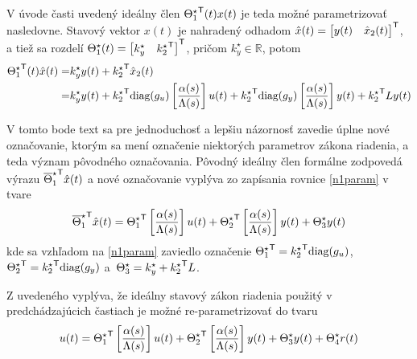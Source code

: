 \documentclass[a4paper, 10pt, ]{article}
\begin{document}
V úvode časti uvedený ideálny člen ${\Theta_1^\star}^{\mathsf{T}}(t) x(t)$ je teda možné parametrizovať nasledovne. Stavový vektor $x(t)$ je nahradený odhadom $\hat{x}(t) = \begin{bmatrix} y(t) & \hat{x}_2(t) \end{bmatrix}^{\mathsf{T}}$, a tiež sa rozdelí $\Theta_1^\star(t) = \begin{bmatrix} k_y^\star & {k_2^\star}^{\mathsf{T}} \end{bmatrix}^{\mathsf{T}}$, pričom $k_y^\star \in \mathbb{R}$, potom
\begin{equation} \label{n1param}
	\begin{split}
		{\Theta_1^\star}^{\mathsf{T}}(t) \hat{x}(t)
		= &
		k_y^\star y(t) + {k_2^\star}^{\mathsf{T}} \hat{x}_2(t)
		\\ = &
		k_y^\star y(t)
		+
		{k_2^\star}^{\mathsf{T}}
		\text{diag}(g_u) \left[ \frac{\alpha(s)}{\Lambda(s)} \right] u(t)
		+
		{k_2^\star}^{\mathsf{T}}
		\text{diag}(g_y) \left[ \frac{\alpha(s)}{\Lambda(s)} \right] y(t)
		+ {k_2^\star}^{\mathsf{T}} L y(t)
	\end{split}
\end{equation}










V tomto bode text sa pre jednoduchosť a lepšiu názornosť zavedie úplne nové označovanie, ktorým sa mení označenie niektorých parametrov zákona riadenia, a teda význam pôvodného označovania. Pôvodný ideálny člen formálne zodpovedá výrazu ${\overline{\Theta}_1^\star}^{\mathsf{T}} \hat{x}(t)$ a nové označovanie vyplýva zo zapísania rovnice \eqref{n1param} v tvare
\begin{equation} \label{n1param2}
	{\overline{\Theta}_1^\star}^{\mathsf{T}} \hat{x}(t)
	=
	{\Theta_1^\star}^{\mathsf{T}} \left[ \frac{\alpha(s)}{\Lambda(s)} \right] u(t)
	+
	{\Theta_2^\star}^{\mathsf{T}} \left[ \frac{\alpha(s)}{\Lambda(s)} \right] y(t)
	+
	\Theta_3^\star y(t)
\end{equation}
kde sa vzhľadom na \eqref{n1param} zaviedlo označenie ${\Theta_1^\star}^{\mathsf{T}} = {k_2^\star}^{\mathsf{T}} \text{diag}(g_u)$,   ${\Theta_2^\star}^{\mathsf{T}} = {k_2^\star}^{\mathsf{T}} \text{diag}(g_y)$ a~$\Theta_3^\star = k_y^\star + {k_2^\star}^{\mathsf{T}} L$.

Z uvedeného vyplýva, že ideálny stavový zákon riadenia použitý v predchádzajúcich častiach je možné re-parametrizovať do tvaru
\begin{equation} \label{n1reparamzr}
	u(t)
	=
	{\Theta_1^\star}^{\mathsf{T}} \left[ \frac{\alpha(s)}{\Lambda(s)} \right] u(t)
	+
	{\Theta_2^\star}^{\mathsf{T}} \left[ \frac{\alpha(s)}{\Lambda(s)} \right] y(t)
	+
	\Theta_3^\star y(t)
	+
	\Theta_4^\star r(t)
\end{equation}
\end{document}
